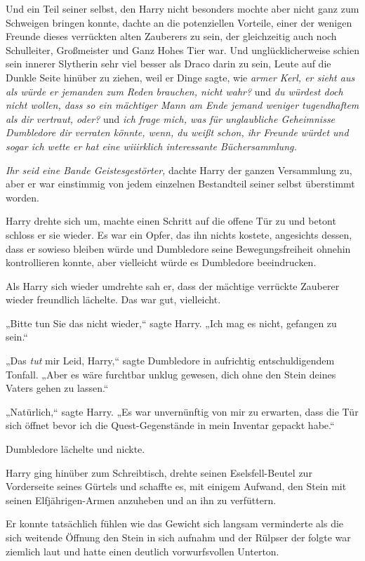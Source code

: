 {Und ein Teil seiner selbst, den Harry nicht besonders mochte aber nicht ganz zum Schweigen bringen konnte, dachte an die potenziellen Vorteile, einer der wenigen Freunde dieses verrückten alten Zauberers zu sein, der gleichzeitig auch noch Schulleiter, Großmeister und Ganz Hohes Tier war. Und unglücklicherweise schien sein innerer Slytherin sehr viel besser als Draco darin zu sein, Leute auf die Dunkle Seite hinüber zu ziehen, weil er Dinge sagte, wie \emph{armer Kerl, er sieht aus als würde er jemanden zum Reden brauchen, nicht wahr?} und \emph{du würdest doch nicht wollen, dass so ein mächtiger Mann am Ende jemand weniger tugendhaftem als dir vertraut, oder?} und \emph{ich frage mich, was für unglaubliche Geheimnisse Dumbledore dir verraten könnte, wenn, du weißt schon, ihr Freunde würdet und sogar ich wette er hat eine wiiirklich interessante Büchersammlung.}

\emph{Ihr seid eine Bande Geistesgestörter,} dachte Harry der ganzen Versammlung zu, aber er war einstimmig von jedem einzelnen Bestandteil seiner selbst überstimmt worden.

Harry drehte sich um, machte einen Schritt auf die offene Tür zu und betont schloss er sie wieder. Es war ein Opfer, das ihn nichts kostete, angesichts dessen, dass er sowieso bleiben würde und Dumbledore seine Bewegungsfreiheit ohnehin kontrollieren konnte, aber vielleicht würde es Dumbledore beeindrucken.

Als Harry sich wieder umdrehte sah er, dass der mächtige verrückte Zauberer wieder freundlich lächelte. Das war gut, vielleicht.

„Bitte tun Sie das nicht wieder,“ sagte Harry. „Ich mag es nicht, gefangen zu sein.“

„Das \emph{tut} mir Leid, Harry,“ sagte Dumbledore in aufrichtig entschuldigendem Tonfall. „Aber es wäre furchtbar unklug gewesen, dich ohne den Stein deines Vaters gehen zu lassen.“

„Natürlich,“ sagte Harry. „Es war unvernünftig von mir zu erwarten, dass die Tür sich öffnet bevor ich die Quest-Gegenstände in mein Inventar gepackt habe.“

Dumbledore lächelte und nickte.

Harry ging hinüber zum Schreibtisch, drehte seinen Eselsfell-Beutel zur Vorderseite seines Gürtels und schaffte es, mit einigem Aufwand, den Stein mit seinen Elfjährigen-Armen anzuheben und an ihn zu verfüttern.

Er konnte tatsächlich fühlen wie das Gewicht sich langsam verminderte als die sich weitende Öffnung den Stein in sich aufnahm und der Rülpser der folgte war ziemlich laut und hatte einen deutlich vorwurfsvollen Unterton.

}
